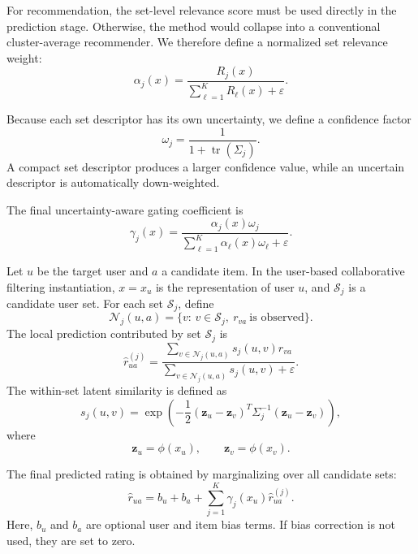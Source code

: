 \documentclass{article}
\theoremstyle{plain}
\theoremstyle{definition}
\theoremstyle{remark}
\begin{document}
For recommendation, the set-level relevance score must be used directly in the prediction stage. Otherwise, the method would collapse into a conventional cluster-average recommender. We therefore define a normalized set relevance weight:
\begin{equation}
	\label{eq:normalized_relevance}
	\alpha_j(x)
	=
	\frac{
		R_j(x)
	}{
		\sum_{\ell=1}^{K}R_\ell(x)+\varepsilon
	}.
\end{equation}

Because each set descriptor has its own uncertainty, we define a confidence factor
\begin{equation}
	\label{eq:set_confidence}
	\omega_j
	=
	\frac{1}{1+\operatorname{tr}(\Sigma_j)}.
\end{equation}
A compact set descriptor produces a larger confidence value, while an uncertain descriptor is automatically down-weighted.

The final uncertainty-aware gating coefficient is
\begin{equation}
	\label{eq:uncertainty_gate}
	\gamma_j(x)
	=
	\frac{
		\alpha_j(x)\omega_j
	}{
		\sum_{\ell=1}^{K}\alpha_\ell(x)\omega_\ell+\varepsilon
	}.
\end{equation}

Let \(u\) be the target user and \(a\) a candidate item. In the user-based collaborative filtering instantiation, \(x=x_u\) is the representation of user \(u\), and \(\mathcal S_j\) is a candidate user set. For each set \(\mathcal S_j\), define
\[
\mathcal N_j(u,a)
=
\{v:\,v\in\mathcal S_j,\ r_{va}\ \text{is observed}\}.
\]
The local prediction contributed by set \(\mathcal S_j\) is
\begin{equation}
	\label{eq:local_prediction}
	\widehat r_{ua}^{(j)}
	=
	\frac{
		\sum_{v\in\mathcal N_j(u,a)}
		s_j(u,v)r_{va}
	}{
		\sum_{v\in\mathcal N_j(u,a)}
		s_j(u,v)+\varepsilon
	}.
\end{equation}
The within-set latent similarity is defined as
\begin{equation}
	\label{eq:latent_similarity}
	s_j(u,v)
	=
	\exp\left(
	-\frac{1}{2}
	(\mathbf z_u-\mathbf z_v)^T
	\Sigma_j^{-1}
	(\mathbf z_u-\mathbf z_v)
	\right),
\end{equation}
where
\[
\mathbf z_u=\phi(x_u),
\qquad
\mathbf z_v=\phi(x_v).
\]

The final predicted rating is obtained by marginalizing over all candidate sets:
\begin{equation}
	\label{eq:bayesian_rating_prediction}
	\widehat r_{ua}
	=
	b_u+b_a+
	\sum_{j=1}^{K}
	\gamma_j(x_u)
	\widehat r_{ua}^{(j)}.
\end{equation}
Here, \(b_u\) and \(b_a\) are optional user and item bias terms. If bias correction is not used, they are set to zero.
\end{document}
